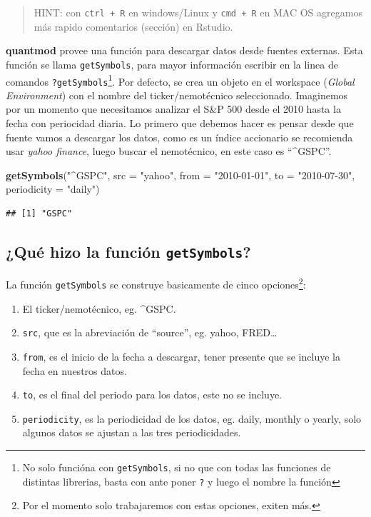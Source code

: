 \documentclass[12pt,]{book}
\newenvironment{Shaded}{\begin{snugshade}}{\end{snugshade}}
\newcommand{\KeywordTok}[1]{\textcolor[rgb]{0.13,0.29,0.53}{\textbf{#1}}}
\newcommand{\DataTypeTok}[1]{\textcolor[rgb]{0.13,0.29,0.53}{#1}}
\newcommand{\StringTok}[1]{\textcolor[rgb]{0.31,0.60,0.02}{#1}}
\newcommand{\NormalTok}[1]{#1}
\providecommand{\tightlist}{%
  \setlength{\itemsep}{0pt}\setlength{\parskip}{0pt}}
\begin{document}
\begin{quote}
HINT: con \texttt{ctrl\ +\ R} en windows/Linux y \texttt{cmd\ +\ R} en
MAC OS agregamos más rapido comentarios (sección) en Rstudio.
\end{quote}

\textbf{quantmod} provee una función para descargar datos desde fuentes
externas. Esta función se llama \texttt{getSymbols}, para mayor
información escribir en la linea de comandos
\texttt{?getSymbols}\footnote{No solo funcióna con \texttt{getSymbols},
  si no que con todas las funciones de distintas librerias, basta con
  ante poner \texttt{?} y luego el nombre la función}. Por defecto, se
crea un objeto en el workspace (\emph{Global Environment}) con el nombre
del ticker/nemotécnico seleccionado. Imaginemos por un momento que
necesitamos analizar el S\&P 500 desde el 2010 hasta la fecha con
periocidad diaria. Lo primero que debemos hacer es pensar desde que
fuente vamos a descargar los datos, como es un índice accionario se
recomienda usar \emph{yahoo finance}, luego buscar el nemotécnico, en
este caso es ``\^{}GSPC''.

\begin{Shaded}
\begin{Highlighting}[]
\KeywordTok{getSymbols}\NormalTok{(}\StringTok{"^GSPC"}\NormalTok{, }\DataTypeTok{src =} \StringTok{"yahoo"}\NormalTok{, }\DataTypeTok{from =} \StringTok{"2010-01-01"}\NormalTok{, }\DataTypeTok{to =} \StringTok{"2010-07-30"}\NormalTok{, }\DataTypeTok{periodicity =} \StringTok{"daily"}\NormalTok{)}
\end{Highlighting}
\end{Shaded}

\begin{verbatim}
## [1] "GSPC"
\end{verbatim}

\subsection{\texorpdfstring{¿Qué hizo la función
\texttt{getSymbols}?}{¿Qué hizo la función getSymbols?}}\label{que-hizo-la-funcion-getsymbols}

La función \texttt{getSymbols} se construye basicamente de cinco
opciones\footnote{Por el momento solo trabajaremos con estas opciones,
  exiten más.}:

\begin{enumerate}
\def\labelenumi{\arabic{enumi}.}
\tightlist
\item
  El ticker/nemotécnico, eg. \^{}GSPC.
\item
  \texttt{src}, que es la abreviación de ``source'', eg. yahoo,
  FRED\ldots{}
\item
  \texttt{from}, es el inicio de la fecha a descargar, tener presente
  que se incluye la fecha en nuestros datos.
\item
  \texttt{to}, es el final del periodo para los datos, este no se
  incluye.
\item
  \texttt{periodicity}, es la periodicidad de los datos, eg. daily,
  monthly o yearly, solo algunos datos se ajustan a las tres
  periodicidades.
\end{enumerate}
\end{document}
